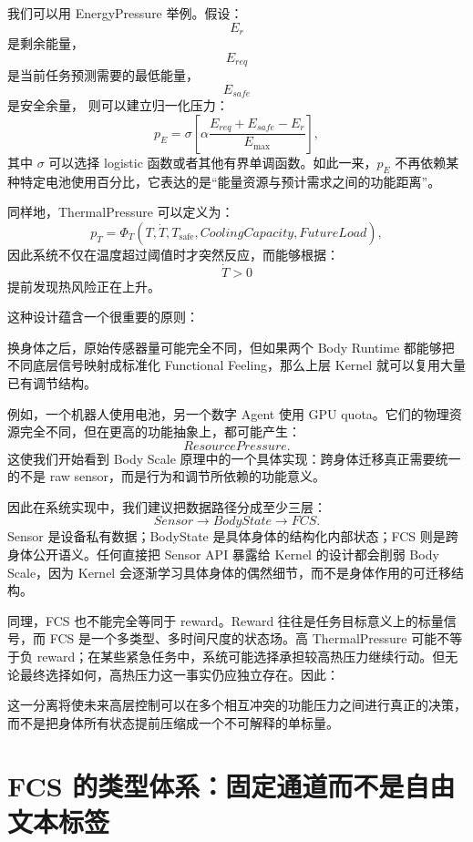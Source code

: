 我们可以用 EnergyPressure 举例。假设：
\[
E_r
\]
是剩余能量，
\[
E_{req}
\]
是当前任务预测需要的最低能量，
\[
E_{safe}
\]
是安全余量，
则可以建立归一化压力：
\[
p_E
=
\sigma
\left[
\alpha
\frac{
E_{req}+E_{safe}-E_r
}{
E_{\max}
}
\right],
\]
其中 $\sigma$ 可以选择 logistic 函数或者其他有界单调函数。如此一来，$p_E$ 不再依赖某种特定电池使用百分比，它表达的是“能量资源与预计需求之间的功能距离”。

同样地，ThermalPressure 可以定义为：
\[
p_T
=
\Phi_T
\left(
T,
\dot T,
T_{\mathrm{safe}},
CoolingCapacity,
FutureLoad
\right),
\]
因此系统不仅在温度超过阈值时才突然反应，而能够根据：
\[
\dot T>0
\]
提前发现热风险正在上升。

这种设计蕴含一个很重要的原则：
\begin{statementbox}
\centering
{}
\end{statementbox}
换身体之后，原始传感器量可能完全不同，但如果两个 Body Runtime 都能够把不同底层信号映射成标准化 Functional Feeling，那么上层 Kernel 就可以复用大量已有调节结构。

例如，一个机器人使用电池，另一个数字 Agent 使用 GPU quota。它们的物理资源完全不同，但在更高的功能抽象上，都可能产生：
\[
ResourcePressure.
\]
这使我们开始看到 Body Scale 原理中的一个具体实现：跨身体迁移真正需要统一的不是 raw sensor，而是行为和调节所依赖的功能意义。

因此在系统实现中，我们建议把数据路径分成至少三层：
\[
Sensor
\rightarrow
BodyState
\rightarrow
FCS.
\]
Sensor 是设备私有数据；BodyState 是具体身体的结构化内部状态；FCS 则是跨身体公开语义。任何直接把 Sensor API 暴露给 Kernel 的设计都会削弱 Body Scale，因为 Kernel 会逐渐学习具体身体的偶然细节，而不是身体作用的可迁移结构。

同理，FCS 也不能完全等同于 reward。Reward 往往是任务目标意义上的标量信号，而 FCS 是一个多类型、多时间尺度的状态场。高 ThermalPressure 可能不等于负 reward；在某些紧急任务中，系统可能选择承担较高热压力继续行动。但无论最终选择如何，高热压力这一事实仍应独立存在。因此：
\begin{statementbox}
\centering
{}
\end{statementbox}
这一分离将使未来高层控制可以在多个相互冲突的功能压力之间进行真正的决策，而不是把身体所有状态提前压缩成一个不可解释的单标量。

\section{FCS 的类型体系：固定通道而不是自由文本标签}

